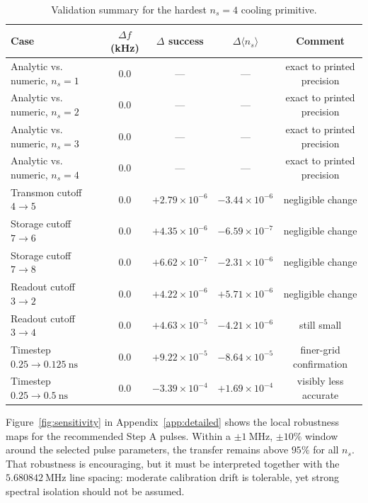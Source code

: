 \documentclass[aps,pra,twocolumn,reprint,floatfix,amsmath,amssymb]{revtex4-2}
\newcommand{\avg}[1]{\langle #1 \rangle}
\begin{document}
\begin{table}[t]
\caption{Validation summary for the hardest \(n_s=4\) cooling primitive.}
\label{tab:validation}
\begin{tabular*}{\textwidth}{@{\extracolsep{\fill}}lcccc}
\toprule
Case & \(\Delta f\) (kHz) & \(\Delta\) success & \(\Delta \avg{n_s}\) & Comment \\
\midrule
Analytic vs. numeric, \(n_s=1\) & 0.0 & --- & --- & exact to printed precision \\
Analytic vs. numeric, \(n_s=2\) & 0.0 & --- & --- & exact to printed precision \\
Analytic vs. numeric, \(n_s=3\) & 0.0 & --- & --- & exact to printed precision \\
Analytic vs. numeric, \(n_s=4\) & 0.0 & --- & --- & exact to printed precision \\
Transmon cutoff \(4\rightarrow5\) & 0.0 & \(+2.79\times10^{-6}\) & \(-3.44\times10^{-6}\) & negligible change \\
Storage cutoff \(7\rightarrow6\) & 0.0 & \(+4.35\times10^{-6}\) & \(-6.59\times10^{-7}\) & negligible change \\
Storage cutoff \(7\rightarrow8\) & 0.0 & \(+6.62\times10^{-7}\) & \(-2.31\times10^{-6}\) & negligible change \\
Readout cutoff \(3\rightarrow2\) & 0.0 & \(+4.22\times10^{-6}\) & \(+5.71\times10^{-6}\) & negligible change \\
Readout cutoff \(3\rightarrow4\) & 0.0 & \(+4.63\times10^{-5}\) & \(-4.21\times10^{-6}\) & still small \\
Timestep \(0.25\rightarrow\SI{0.125}{\nano\second}\) & 0.0 & \(+9.22\times10^{-5}\) & \(-8.64\times10^{-5}\) & finer-grid confirmation \\
Timestep \(0.25\rightarrow\SI{0.5}{\nano\second}\) & 0.0 & \(-3.39\times10^{-4}\) & \(+1.69\times10^{-4}\) & visibly less accurate \\
\bottomrule
\end{tabular*}
\end{table}

Figure~\ref{fig:sensitivity} in Appendix~\ref{app:detailed} shows the local robustness maps for the recommended Step A pulses. Within a \(\pm\SI{1}{\mega\hertz}\), \(\pm10\%\) window around the selected pulse parameters, the transfer remains above \(95\%\) for all \(n_s\). That robustness is encouraging, but it must be interpreted together with the \(5.680842~\si{\mega\hertz}\) line spacing: moderate calibration drift is tolerable, yet strong spectral isolation should not be assumed.
\end{document}
